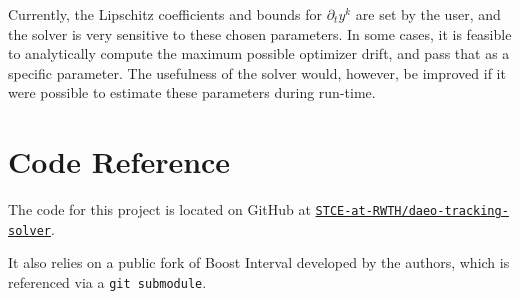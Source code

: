 \documentclass[twoside,leqno, twocolumn]{article}
\begin{document}
Currently, the Lipschitz coefficients and bounds for $\partial_ty^k$ are set by the user, and the solver is very sensitive to these chosen parameters. In some cases, it is feasible to analytically compute the maximum possible optimizer drift, and pass that as a specific parameter. The usefulness of the solver would, however, be improved if it were possible to estimate these parameters during run-time.




\appendix
\section{Code Reference}
The code for this project is located on GitHub at
\href{https://github.com/STCE-at-RWTH/daeo-tracking-solver}{\texttt{STCE-at-RWTH/daeo-tracking-solver}}. 

It also relies on a public fork of Boost Interval developed by the authors, which is referenced via a \texttt{git submodule}.

\newpage

\printbibliography
\end{document}
